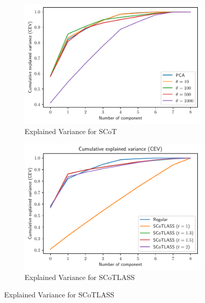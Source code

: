 \documentclass[11pt,letterpaper]{report}
\begin{document}
\begin{figure}
\begin{subfigure}[htpb!]{0.49\textwidth}
    \centering
    \caption{Explained Variance for SCoT}
    \label{fig:EV_SCoT}
    \includegraphics[scale = 0.5]{"../Figures/SCoT_comparison.pdf"}
\end{subfigure}
\begin{subfigure}[htpb!]{0.49\textwidth}
    \centering
    \caption{Explained Variance for SCoTLASS}
    \label{fig:EV_SCoTLASS}
    \includegraphics[scale = 0.5]{"../Figures/SCoTLASS_comparison.pdf"}
\end{subfigure}
\end{figure}
\end{document}

